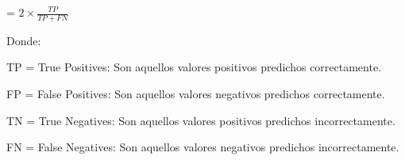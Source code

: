  = \(2 \times \frac{TP}{TP + FN}\)

Donde:

TP = True Positives: Son aquellos valores positivos predichos correctamente.

FP = False Positives: Son aquellos valores negativos predichos correctamente.

TN = True Negatives: Son aquellos valores positivos predichos incorrectamente.

FN = False Negatives: Son aquellos valores negativos predichos incorrectamente.
